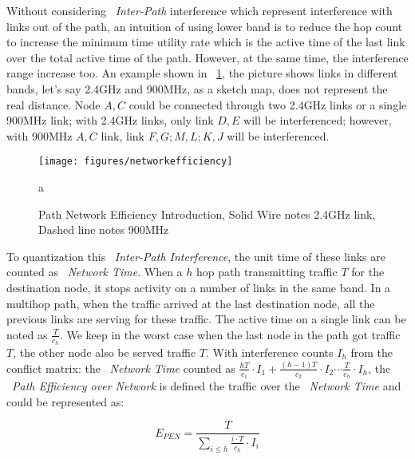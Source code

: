 Without considering ~\emph{Inter-Path} interference which represent interference with links out of the path, 
an intuition of using lower band is to reduce the hop count
 to increase the minimum time utility rate which is the active time of the last link over the total active time of the path. 
However, at the same time, the interference range increase too. An example shown in ~\ref{fig:networkefficiency}, 
the picture shows links in different bands, let's say 2.4GHz and 900MHz, as a sketch map, does not represent the real distance.
Node $A,C$ could be connected through two 2.4GHz links or a single 900MHz link; with 2.4GHz links, only link $D,E$ will be interferenced; however, with 900MHz $A,C$ link, link $F,G;M,L;K,J$ will be interferenced. 


\begin{figure}
\centering
\texttt{[image: figures/networkefficiency]}
\vspace{-0.1in}
\caption{Path Network Efficiency Introduction, Solid Wire notes 2.4GHz link, Dashed line notes 900MHz}
\label{fig:networkefficiency}
a\end{figure}

To quantization this ~\emph{Inter-Path Interference}, 
the unit time of these links are counted as ~\emph{Network Time}. 
When a $h$ hop path transmitting traffic $T$ for the destination node, it stops activity on a number of links in the same band. 
In a multihop path, when the traffic arrived at the last destination node, all the previous links are serving for these traffic.
The active time on a single link can be noted as 
$\frac{T}{c_h}$. We keep in the worst case when the last node in the path got traffic $T$, the other node also be served traffic $T$.
With interference counts $I_h$ from the conflict matrix:
the ~\emph{Network Time} counted as 
$\frac{hT}{c_1}\cdot I_1 + \frac{(h-1)T}{c_2}\cdot I_2 \cdots \frac{T}{c_h}\cdot I_h$, the ~\emph{Path Efficiency over Network} is defined the traffic over the ~\emph{Network Time} and could be represented as:



\begin{equation}
\label{eq:originpen}
E_{PEN}=\frac{T}{\sum_{i \leq h}\frac{i\cdot T}{c_h}\cdot I_i }
\end{equation}

